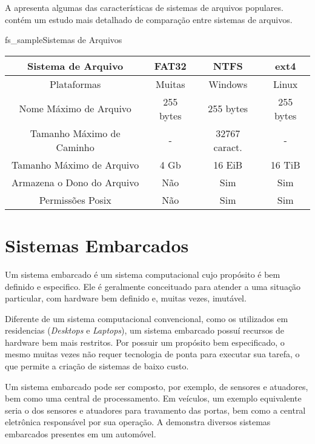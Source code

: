 
A  apresenta algumas das características de sistemas de arquivos populares.  contém um estudo mais detalhado de comparação entre sistemas de arquivos.

\begin{tabela}{fs_sample}{Sistemas de Arquivos}
	\begin{tabular}{|c|c|c|c|}
		\hline 
		Sistema de Arquivo & FAT32 & NTFS & ext4 \\ 
		\hline \hline
		Plataformas & Muitas & Windows & Linux \\ 
		\hline 
		Nome Máximo de Arquivo & 255 bytes & 255 bytes & 255 bytes \\ 
		\hline 
		Tamanho Máximo de Caminho & - & 32767 caract. & - \\ 
		\hline 
		Tamanho Máximo de Arquivo & 4 Gb & 16 EiB & 16 TiB \\ 
		\hline 
		Armazena o Dono do Arquivo & Não & Sim & Sim \\ 
		\hline 
		Permissões Posix & Não & Sim & Sim \\ 
		\hline 
	\end{tabular}
\end{tabela}

\section{Sistemas Embarcados}

Um sistema embarcado é um sistema computacional cujo propósito é bem definido e especifico. Ele é geralmente conceituado para atender a uma situação particular, com hardware bem definido e, muitas vezes, imutável.

Diferente de um sistema computacional convencional, como os utilizados em residencias (\emph{Desktops} e \emph{Laptops}), um sistema embarcado possuí recursos de hardware bem mais restritos. Por possuir um propósito bem especificado, o mesmo muitas vezes não requer tecnologia de ponta para executar sua tarefa, o que permite a criação de sistemas de baixo custo.

Um sistema embarcado pode ser composto, por exemplo, de sensores e atuadores, bem como uma central de processamento. Em veículos, um exemplo equivalente seria o dos sensores e atuadores para travamento das portas, bem como a central eletrônica responsável por sua operação. A  demonstra diversos sistemas embarcados presentes em um automóvel.

